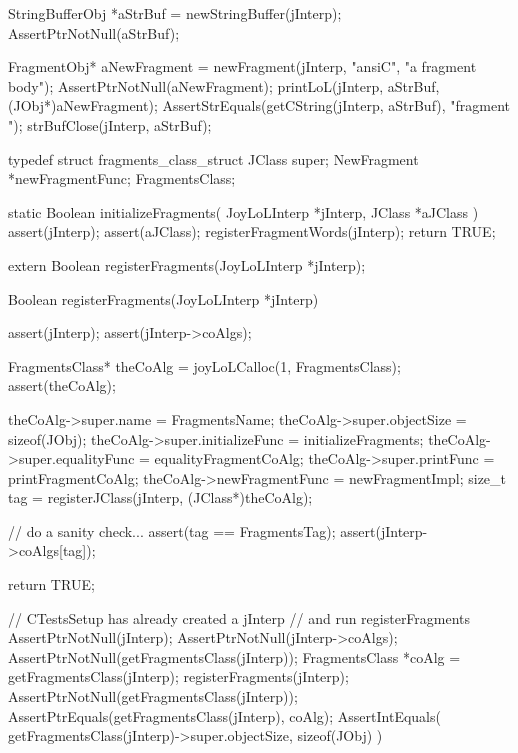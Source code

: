   StringBufferObj *aStrBuf = newStringBuffer(jInterp);
  AssertPtrNotNull(aStrBuf);
  
  FragmentObj* aNewFragment =
    newFragment(jInterp, "ansiC", "a fragment body");
  AssertPtrNotNull(aNewFragment);
  printLoL(jInterp, aStrBuf, (JObj*)aNewFragment);
  AssertStrEquals(getCString(jInterp, aStrBuf), "fragment ");
  strBufClose(jInterp, aStrBuf);
\stopCTest
\stopTestCase
\stopTestSuite

\startTestSuite[registerFragments]

\startCHeader
typedef struct fragments_class_struct {
  JClass       super;
  NewFragment      *newFragmentFunc;
} FragmentsClass;

\stopCHeader

\startCCode
static Boolean initializeFragments(
  JoyLoLInterp *jInterp,
  JClass   *aJClass
) {
  assert(jInterp);
  assert(aJClass);
  registerFragmentWords(jInterp);
  return TRUE;
}
\stopCCode

\startCHeader
extern Boolean registerFragments(JoyLoLInterp *jInterp);
\stopCHeader
{}

\startCCode
Boolean registerFragments(JoyLoLInterp *jInterp) {
  assert(jInterp);
  assert(jInterp->coAlgs);
  
  FragmentsClass* theCoAlg
    = joyLoLCalloc(1, FragmentsClass);
  assert(theCoAlg);
  
  theCoAlg->super.name           = FragmentsName;
  theCoAlg->super.objectSize     = sizeof(JObj);
  theCoAlg->super.initializeFunc = initializeFragments;
  theCoAlg->super.equalityFunc   = equalityFragmentCoAlg;
  theCoAlg->super.printFunc      = printFragmentCoAlg;
  theCoAlg->newFragmentFunc = newFragmentImpl;
  size_t tag =
    registerJClass(jInterp, (JClass*)theCoAlg);
  
  // do a sanity check...
  assert(tag == FragmentsTag);
  assert(jInterp->coAlgs[tag]);
   
  return TRUE;
}
\stopCCode


\startCTest
  // CTestsSetup has already created a jInterp
  // and run registerFragments
  AssertPtrNotNull(jInterp);
  AssertPtrNotNull(jInterp->coAlgs);
  AssertPtrNotNull(getFragmentsClass(jInterp));
  FragmentsClass *coAlg = getFragmentsClass(jInterp);
  registerFragments(jInterp);
  AssertPtrNotNull(getFragmentsClass(jInterp));
  AssertPtrEquals(getFragmentsClass(jInterp), coAlg);
  AssertIntEquals(
    getFragmentsClass(jInterp)->super.objectSize,
    sizeof(JObj)
  )
\stopCTest
\stopTestCase
\stopTestSuite
